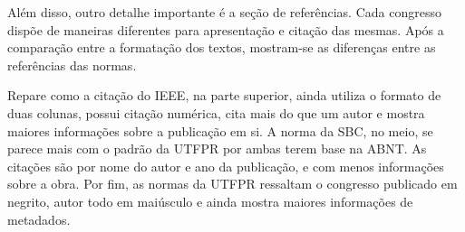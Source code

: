 

Além disso, outro detalhe importante é a seção de referências. Cada congresso dispõe de maneiras diferentes para apresentação e citação das mesmas. Após a comparação entre a formatação dos textos, mostram-se as diferenças entre as referências das normas.

Repare como a citação do IEEE, na parte superior, ainda utiliza o formato de duas colunas, possui citação numérica, cita mais do que um autor e mostra maiores informações sobre a publicação em si. A norma da SBC, no meio, se parece mais com o padrão da UTFPR por ambas terem base na ABNT. As citações são por nome do autor e ano da publicação, e com menos informações sobre a obra. Por fim, as normas da UTFPR ressaltam o congresso publicado em negrito, autor todo em maiúsculo e ainda mostra maiores informações de metadados.

